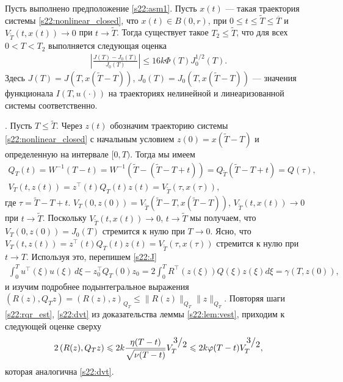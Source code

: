 \documentclass[../main.tex]{subfiles}
\begin{document}
\begin{theorem}\label{s22:th:functional_error_estimate}
 Пусть выполнено предположение \ref{s22:asm1}. 
Пусть $x(t)$ --- такая траектория системы \eqref{s22:nonlinear_closed}, что $x(t)\in B(0,r)$, при $0\leqslant t \leqslant \tilde{T} \leqslant \overline{T} $ и $V_{\tilde{T}}(t,x(t))\to 0$ при $t\to \tilde{T}$. 
 Тогда существует такое $T_2 \leqslant \tilde{T}$, что для всех $0 < T < T_2 $ выполняется следующая оценка
 \begin{gather} \label{s22:est}
 \left| \frac{ J(T) - J_0(T)}{J_0(T)}\right| \leqslant 16k\Phi({T})J^{1/2}_0(T).
 \end{gather}
 Здесь $J(T)=J(T,x(\tilde{T}-T))$, $J_0(T)=J_0(T,x(\tilde{T}-T))$ --- значения функционала $I(T,u(\cdot))$ на траекториях нелинейной и линеаризованной системы соответственно.
\end{theorem}
\doc. 
Пусть $T\leqslant \tilde{T}$. 
Через $z(t)$ обозначим траекторию системы \eqref{s22:nonlinear_closed} с начальным условием $z(0)=x(\tilde{T}-T)$ и определенную на интервале $[0,T)$. 
Тогда мы имеем 
\begin{gather*}
Q_T(t)=W^{-1}(T-t)=W^{-1}(\tilde{T}-(\tilde{T}-T+t))=Q_{\tilde{T}}(\tilde{T}-T+t) = Q(\tau), \\ V_T(t,z(t))=z^\top(t)Q_T(t)z(t)=V_{\tilde{T}}(\tau,x(\tau)),
\end{gather*}
где $\tau=\tilde{T}-T+t$. 
$V_T(0,z(0))=V_{\tilde{T}}(\tilde{T}-T, x(\tilde{T}-T))$, $V_{\tilde{T}}(t,x(t))\to 0$ при $t\to \tilde{T}$. 
Поскольку $V_{\tilde{T}}(t,x(t))\to 0$, $t\to \tilde{T}$ мы получаем, что $V_T(0,z(0))=J_0(T)$ стремится к нулю при $T\to 0$.
Ясно, что $V_T(t,z(t))=z^\top(t)Q_T(t)z(t)=V_{\tilde{T}}(\tau,x(\tau))$ стремится к нулю при $t\to T$.
Используя это, перепишем \eqref{s22:J} 
\begin{gather}\label{s22:J1}
 \int_{0}^{T} u^{\top}(\xi) u(\xi) \, d\xi - z_0^{\top} Q_T(0)z_0= 2\int_{0}^{T} R^{\top}(z(\xi))Q(\xi) z(\xi) d\xi=\gamma(T,z(0)),
\end{gather}
и изучим подробнее подынтегральное выражения $\left( R(z), Q_T z\right)=(R(z),z)_{Q_T} \leqslant \| R(z) \|_{Q_T} \| z \|_{Q_T}$.
Повторяя шаги \eqref{s22:rqr_est}, \eqref{s22:dvt} из доказательства леммы \ref{s22:lem:vest}, приходим к следующей оценке сверху
\begin{gather}\label{s22:rqz}
 2 \left( R(z), Q_T z\right) \leqslant 2 k \frac{\eta(T-t)}{\sqrt{\nu(T-t)}}V_T^{\frc{3}{2}} \leqslant 2k \varphi(T-t) V_T^{\frc{3}{2}},
\end{gather}
которая аналогична \eqref{s22:dvt}. 
\end{document}
